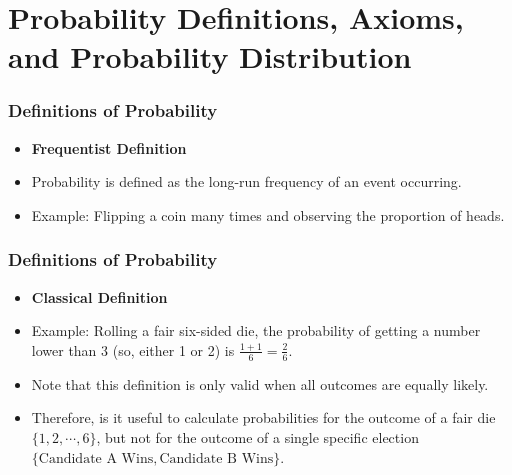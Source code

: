 \documentclass[handout]{beamer} %
\begin{document}
\section{Probability Definitions, Axioms, and Probability Distribution}

\begin{frame}
\frametitle{Definitions of Probability}
\begin{itemize}
    \item \textbf{Frequentist Definition}
\end{itemize}    

\pause

    \begin{itemize}
        \item Probability is defined as the long-run frequency of an event occurring.  \pause
        \item Example: Flipping a coin many times and observing the proportion of heads.
    \end{itemize}
\end{frame}

\begin{frame}
\frametitle{Definitions of Probability}
\begin{itemize}
    \item \textbf{Classical Definition}
\end{itemize}    

\pause

    \begin{itemize}
        \item Example: Rolling a fair six-sided die, the probability of getting a number lower than 3 (so, either 1 or 2) is \( \frac{1+1}{6} =\frac{2}{6} \). \pause
        \item Note that this definition is only valid when all outcomes are equally likely. \pause
        \item Therefore, is it useful to calculate probabilities for the outcome of a fair die $\{1,2, \cdots, 6\}$, but not for the outcome of a single specific election $\{\text{Candidate A Wins}, \text{Candidate B Wins}\}$.
    \end{itemize}
\end{frame}
\end{document}
